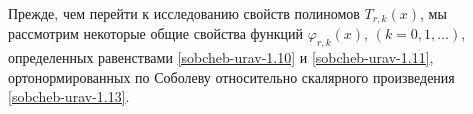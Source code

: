 Прежде, чем  перейти к исследованию свойств полиномов $T_{r,k}(x)$, мы рассмотрим некоторые общие свойства  функций $\varphi_{r,k}(x)$, $(k=0,1,\ldots)$, определенных равенствами \eqref{sobcheb-urav-1.10} и \eqref{sobcheb-urav-1.11},  ортонормированных по Соболеву относительно скалярного произведения \eqref{sobcheb-urav-1.13}.

